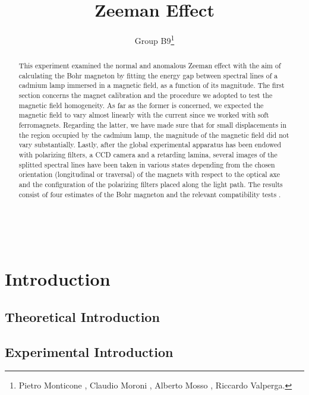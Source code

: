 \documentclass[a4paper,12pt,abstracton]{scrartcl}
\title{Zeeman Effect}
\author{Group B9\footnote{Pietro Monticone , Claudio Moroni , Alberto Mosso , Riccardo Valperga.}}
\begin{document}
\maketitle
\makenomenclature
\begin{abstract}
This experiment examined the normal and anomalous Zeeman effect with the aim of calculating the Bohr magneton by fitting the energy gap between spectral lines of a cadmium lamp immersed in a magnetic field, as a function of its magnitude. The first section concerns the magnet calibration and the procedure we adopted to test the magnetic field homogeneity. As far as the former is concerned, we expected the magnetic field to vary almost linearly with the current since we worked with soft ferromagnets. Regarding the latter, we have made sure that for small displacements in the region occupied by the cadmium lamp, the magnitude of the magnetic field did not vary substantially. Lastly, after the global experimental apparatus has been endowed with polarizing filters, a CCD camera and a retarding lamina, several images of the splitted spectral lines have been taken in various states depending from the chosen orientation (longitudinal or traversal) of the magnets with respect to the optical axe and the configuration of the polarizing filters placed along the light path. The results consist of four estimates of the Bohr magneton and the relevant compatibility tests .
\end{abstract}
\clearpage
\tableofcontents

\mbox{
}
\newpage
\setlength{\columnsep}{27pt} 
\begin{multicols}{2}
\printnomenclature
\end{multicols}
\newpage

\section{Introduction}
\subsection{Theoretical Introduction}
\subsection{Experimental Introduction}
\end{document}

